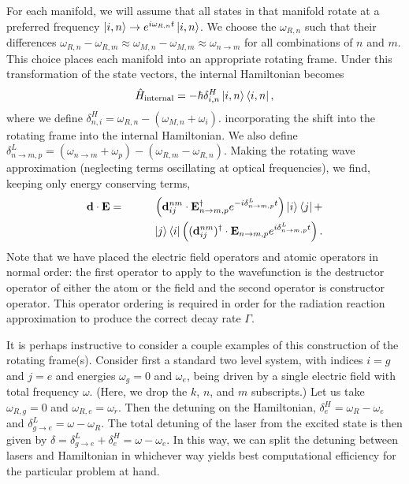 \documentclass[final,5p,times,twocolumn]{elsarticle}
\begin{document}
For each manifold, we will assume that all states in that manifold rotate at a preferred frequency $\ket{i,n} \rightarrow e^{i \omega_{R,n} t}\ket{i, n}$.  
We choose the $\omega_{R,n}$ such that their differences $\omega_{R,n}-\omega_{R,m} \approx \omega_{M,n}-\omega_{M,m} \approx \omega_{n\rightarrow m}$ for all combinations of $n$ and $m$.
This choice places each manifold into an appropriate rotating frame.
Under this transformation of the state vectors, the internal Hamiltonian becomes
\begin{equation}
	\hat{H}_\text{internal} = -\hbar \delta^H_{i, n} \ket{i,n}\Bra{i, n},
\end{equation}
where we define $\delta^H_{n, i} = \omega_{R,n}-(\omega_{M, n}+\omega_i)$.
incorporating the shift into the rotating frame into the internal Hamiltonian.  We also define $\delta^L_{n\rightarrow m, p} = (\omega_{n\rightarrow m} + \omega_p) - (\omega_{R,m} - \omega_{R,n})$.  Making the rotating wave approximation (neglecting terms oscillating at optical frequencies), we find, keeping only energy conserving terms,
\begin{eqnarray}
	\mathbf{d}\cdot\mathbf{E} & = & \left(\mathbf{d}^{nm}_{ij}\cdot\mathbf{E}^\dagger_{n\rightarrow m,p} e^{-i\delta^L_{n\rightarrow m, p}  t} \right)  \ket{i}\Bra{j} +  \nonumber \\
	& & ~~~~~~ \ket{j}\Bra{i} \left((\mathbf{d}^{nm}_{ij})^\dagger \cdot \mathbf{E}_{n\rightarrow m,p}e^{i\delta^L_{n\rightarrow m, p}t}\right).\label{eq:d_dot_E}
\end{eqnarray}
Note that we have placed the electric field operators and atomic operators in normal order: the first operator to apply to the wavefunction is the destructor operator of either the atom or the field and the second operator is constructor operator.  This operator ordering is required in order for the radiation reaction approximation to produce the correct decay rate $\Gamma$.

It is perhaps instructive to consider a couple examples of this construction of the rotating frame(s).  Consider first a standard two level system, with indices $i=g$ and $j=e$ and energies $\omega_g=0$ and $\omega_e$, being driven by a single electric field with total frequency $\omega$.   (Here, we drop the $k$, $n$, and $m$ subscripts.)  Let us take $\omega_{R,g}=0$ and $\omega_{R,e}=\omega_r$.  Then the detuning on the Hamiltonian, $\delta^{H}_e = \omega_R - \omega_e$ and $\delta^L_{g\rightarrow e} = \omega - \omega_R$.  The total detuning of the laser from the excited state is then given by $\delta = \delta^L_{g\rightarrow e}+\delta^H_e = \omega-\omega_e$.  In this way, we can split the detuning between lasers and Hamiltonian in whichever way yields best computational efficiency for the particular problem at hand.
\end{document}

